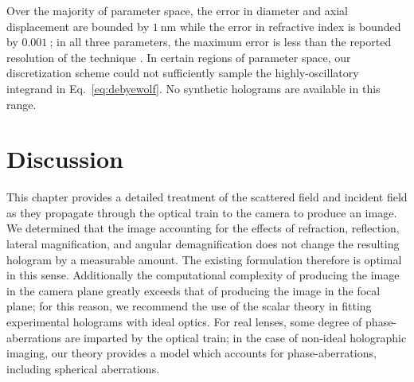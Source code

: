 Over the majority of parameter space, the error in diameter and
axial displacement are bounded by $\SI{1}{\nm}$ while the error
in refractive index is bounded by $\SI{0.001}{}$; in all three
parameters, the maximum error is less than the reported resolution of
the technique \cite{krishnatreya14}. In certain regions of parameter
space, our discretization scheme could not sufficiently sample the
highly-oscillatory integrand in Eq.~\eqref{eq:debyewolf}.
No synthetic holograms are available in this range.

\section{Discussion}

This chapter provides a detailed treatment of the scattered field
and incident field as they propagate through the optical train to the camera
to produce an image.
We determined that the image accounting for
the effects of refraction, reflection, lateral magnification, and angular
demagnification does not change the resulting hologram by a measurable amount.
The existing formulation therefore is optimal in this sense. Additionally the computational complexity of producing
the image in the camera plane greatly exceeds that of producing the
image in the focal plane; for this reason, we recommend the use of the
scalar theory in fitting experimental holograms with ideal optics.
For real lenses, some degree of phase-aberrations are imparted by
the optical train; in the case of non-ideal holographic imaging,
our theory provides a model which accounts for phase-aberrations,
including spherical aberrations.




